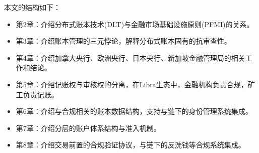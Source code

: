 本文的结构如下：
\begin{itemize}
    \item[] 第2章：介绍分布式账本技术(DLT)与金融市场基础设施原则(PFMI)的关系。
    \item[] 第3章：介绍账本管理的三元悖论，解释分布式账本固有的抗审查性。
    \item[] 第4章：介绍加拿大央行、欧洲央行、日本央行、新加坡金融管理局的相关工作和结论。
    \item[] 第5章：介绍记账权与审核权的分离，在Libra生态中，金融机构负责合规，矿工负责记账。
    \item[] 第6章：介绍与合规相关的账本数据结构，支持与链下的身份管理系统集成。
    \item[] 第7章：介绍分层的账户体系结构与准入机制。
    \item[] 第8章：介绍交易前置的合规验证协议，与链下的反洗钱等合规系统集成。
\end{itemize}




